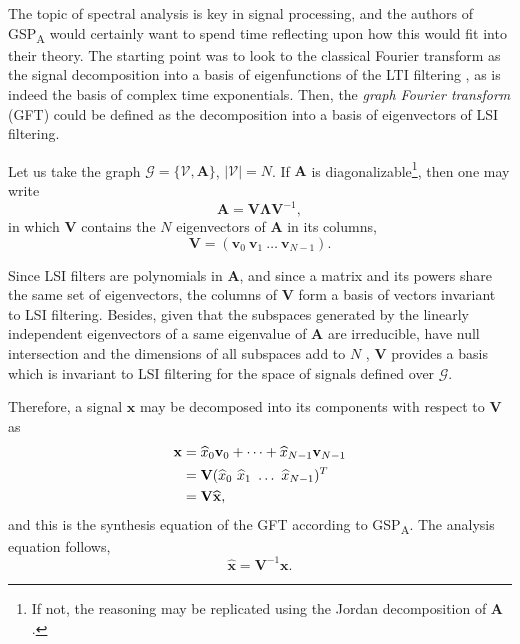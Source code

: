 The topic of spectral analysis is key in signal processing, and the authors of GSP\textsubscript{A} would certainly want to spend time reflecting upon how this would fit into their theory. The starting point was to look to the classical Fourier transform as the signal decomposition into a basis of eigenfunctions of the LTI filtering \cite{oppenheim1997signals}, as is indeed the basis of complex time exponentials. Then, the \emph{graph Fourier transform} (GFT) could be defined as the decomposition into a basis of eigenvectors of LSI filtering.

Let us take the graph $ \mathcal{G} = \{\mathcal{V}, \mathbf{A}\} $, $ |\mathcal{V}| =N $. If $ \mathbf{A} $ is diagonalizable\footnote{If not, the reasoning may be replicated using the Jordan decomposition of $ \mathbf{A} $.}, then one may write
\begin{equation}\label{eq:gft_01}
\mathbf{A} = \mathbf{V} \mathbf{\Lambda} \mathbf{V}^{-1},
\end{equation}
in which $ \mathbf{V} $ contains the $ N $ eigenvectors of $ \mathbf{A} $ in its columns,
\begin{equation}\label{eq:gft_02}
\mathbf{V} = (\mathbf{v}_0 \ \mathbf{v}_1 \ \dots\ \mathbf{v}_{N-1}).
\end{equation}

Since LSI filters are polynomials in $ \mathbf{A} $, and since a matrix and its powers share the same set of eigenvectors, the columns of $ \mathbf{V} $ form a basis of vectors invariant to LSI filtering. Besides, given that the subspaces generated by the linearly independent eigenvectors of a same eigenvalue of $ \mathbf{A} $ are irreducible, have null intersection and the dimensions of all subspaces add to $ N $ \cite{sandryhaila2013gft}, $ \mathbf{V} $ provides a basis which is invariant to LSI filtering for the space of signals defined over $ \mathcal{G} $.

Therefore, a signal $ \mathbf{x} $ may be decomposed into its components with respect to $ \mathbf{V} $ as
\begin{align}\label{eq:GFT_inv}
\mathbf{x} &= \widehat{x}_0 \mathbf{v}_0 + \dots + \widehat{x}_{N-1} \mathbf{v}_{N-1} \notag \\
&= \mathbf{V} (\widehat{x}_0 \ \widehat{x}_1 \ \dots \ \widehat{x}_{N-1})^T \notag \\
&= \mathbf{V} \widehat{\mathbf{x}},
\end{align}
and this is the synthesis equation of the GFT according to GSP\textsubscript{A}. The analysis equation follows,
\begin{equation}\label{eq:GFT_fwd}
\widehat{\mathbf{x}} = \mathbf{V}^{-1} \mathbf{x}.
\end{equation}

